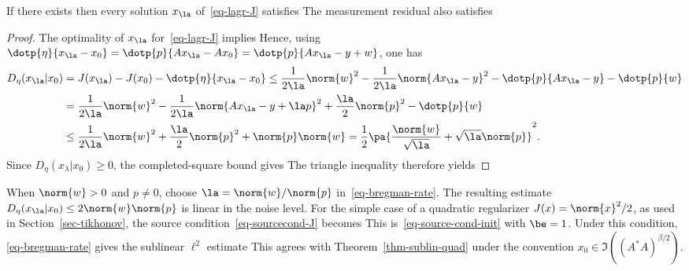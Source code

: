 \begin{thm}\label{thm-bregman-rates}
	If there exists 
    then every solution $x_\la$ of~\eqref{eq-lagr-J} satisfies
    The measurement residual also satisfies
\end{thm}
\begin{proof}
	The optimality of $x_\la$ for~\eqref{eq-lagr-J} implies
	Hence, using $\dotp{\eta}{x_\la-x_0} = \dotp{p}{Ax_\la-Ax_0} = \dotp{p}{A x_\la - y+w}$, one has
	\begin{align*}
		D_\eta(x_\la|x_0) &= J(x_\la)-J(x_0)-\dotp{\eta}{x_\la-x_0} 
			\leq \frac{1}{2\la}\norm{w}^2 - \frac{1}{2\la}\norm{Ax_\la-y}^2 -\dotp{p}{A x_\la-y} - \dotp{p}{w} \\
			& = \frac{1}{2\la}\norm{w}^2 - \frac{1}{2\la}\norm{Ax_\la-y + \la p }^2 + \frac{\la}{2} \norm{p}^2 - \dotp{p}{w} \\
			& \leq \frac{1}{2\la}\norm{w}^2 + \frac{\la}{2} \norm{p}^2 + \norm{p}\norm{w}
			= \frac{1}{2}\pa{ \frac{\norm{w}}{\sqrt{\la}} + \sqrt{\la}\norm{p} }^2.
	\end{align*}
Since $D_\eta(x_\lambda|x_0)\geq0$, the completed-square bound gives
The triangle inequality therefore yields

\end{proof}

When $\norm{w}>0$ and $p\neq0$, choose $\la=\norm{w}/\norm{p}$ in~\eqref{eq-bregman-rate}. The resulting estimate $D_\eta( x_\la|x_0 ) \leq 2 \norm{w}\norm{p}$ is linear in the noise level.
%
For the simple case of a quadratic regularizer $J(x)=\norm{x}^2/2$, as used in Section~\ref{sec-tikhonov}, the source condition~\eqref{eq-sourcecond-J} becomes
This is~\eqref{eq-source-cond-init} with $\be=1$. Under this condition, \eqref{eq-bregman-rate} gives the sublinear $\ell^2$ estimate
This agrees with Theorem~\ref{thm-sublin-quad} under the convention $x_0\in\Im((A^*A)^{\beta/2})$.

